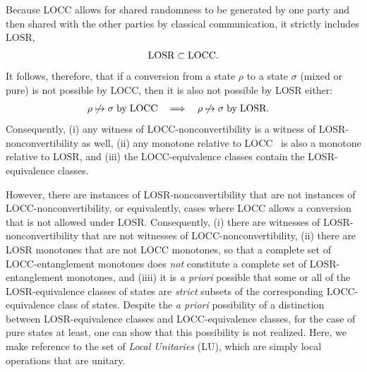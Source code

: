 \documentclass[12pt]{article}
\newcommand{\LOSR}[0]{\ifmmode\textup{\upshape LOSR}\else{\textup{\upshape LOSR}}\fi}
\newcommand{\LOCC}[0]{\ifmmode\textup{\upshape LOCC}\else{\textup{\upshape LOCC}}\fi}
\theoremstyle{plain}
\theoremstyle{definition}
\begin{document}
Because LOCC allows for shared randomness to be generated by one party and then shared with the other parties by classical communication, it strictly includes LOSR,
    \begin{align}
        \label{eq:inclusion}
        \LOSR \subset \LOCC.
    \end{align}
It follows, therefore, that if a conversion from a state $\rho$ to a state $\sigma$ (mixed or pure) is not possible by LOCC, then it is also not possible by LOSR either:
\begin{align}
    \rho \not\mapsto \sigma\;{\rm by}\; \LOCC \ \ &\implies\ \  \rho \not\mapsto \sigma \;{\rm by}\; \LOSR.\label{eq:LOCCstrongestcontrapositive}
\end{align}
Consequently, (i) any witness of LOCC-nonconvertibility is a witness of LOSR-nonconvertibility as well,
(ii) any monotone relative to LOCC~\cite{HHH99b,vidal2000entanglement,GConcurrence,datta2009min} is also a monotone relative to LOSR, and (iii) the LOCC-equivalence classes contain the LOSR-equivalence classes.
 
However, there are instances of LOSR-nonconvertibility that are not instances of LOCC-nonconvertibility, or equivalently, cases where LOCC allows a conversion that is not allowed under LOSR.
Consequently, (i) there are witnesses of LOSR-nonconvertibility that are not witnesses of LOCC-nonconvertibility, (ii)
 there are LOSR monotones that are not LOCC monotones,
so that 
 a complete set of LOCC-entanglement monotones does \emph{not} constitute a complete set of LOSR-entanglement monotones,
and (iiii) it is {\em a priori} possible that some or all of the LOSR-equivalence classes of states are {\em strict} subsets of the corresponding LOCC-equivalence class of states.
Despite the {\em a priori} possibility of a distinction between LOSR-equivalence classes and LOCC-equivalence classes, for the case of pure states at least, one can show that this possibility is not realized.
Here, we make reference to the set of {\em Local Unitaries} (LU), which are simply local operations that are unitary.
\end{document}
